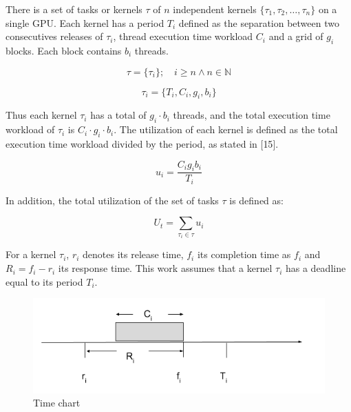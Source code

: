 \documentclass[
  12pt,
  a4paperpaper,
]{report}
\begin{document}
There is a set of tasks or kernels \(\tau\) of \(n\) independent kernels
\(\{\tau_1, \tau_2, \ldots, \tau_n\}\) on a single GPU. Each kernel has
a period \(T_i\) defined as the separation between two consecutives
releases of \(\tau_i\), thread execution time workload \(C_i\) and a
grid of \(g_i\) blocks. Each block contains \(b_i\) threads.

\begin{equation} 
\tau = \{ \tau_i \}; \quad i \geq n \wedge n \in \mathbb{N}
\end{equation}

\begin{equation} 
\tau_i = \{ T_i,  C_i,  g_i,  b_i \}
\label{eq:task_def}
\end{equation}

Thus each kernel \(\tau_i\) has a total of \(g_i\cdot b_i\) threads, and
the total execution time workload of \(\tau_i\) is
\(C_i \cdot g_i \cdot b_i\). The utilization of each kernel is defined
as the total execution time workload divided by the period, as stated in
{[}15{]}.

\begin{equation} 
u_i = \frac{C_i g_i b_i}{T_i}
\label{eq:task_utilization}
\end{equation}

In addition, the total utilization of the set of tasks \(\tau\) is
defined as:

\begin{equation} 
U_t = \sum_{\tau_i \in \tau} u_i
\label{eq:task_utilization}
\end{equation}

For a kernel \(\tau_i\), \(r_i\) denotes its release  time, \(f_i\) its completion time as \(f_i\) and \(R_i = f_i - r_i\) its response time.
This work assumes that a kernel \(\tau_i\) has a deadline equal to its period \(T_i\).

\begin{figure}
\centering
\includegraphics[width=1\textwidth,height=\textheight]{source/figures/task_timing.png}
\caption{Time chart \label{img:task_timing}}
\end{figure}
\end{document}
